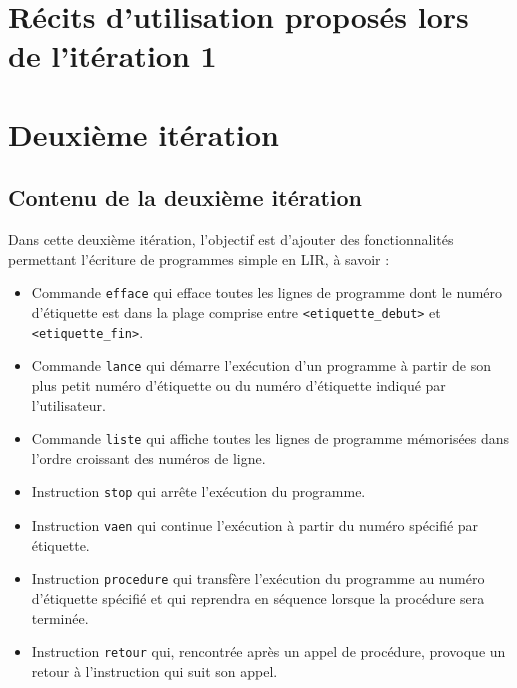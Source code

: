\documentclass[12pt,a4paper,titlepage,openany, oneside]{report}
\begin{document}
    \footnotesize
    \chapter*{Récits d'utilisation proposés lors de l'itération 1}
    
    \newpage
    
    
    
    
    
    
    
    
    
    

    \large
    \chapter{Deuxième itération}
    \section*{Contenu de la deuxième itération}
    Dans cette deuxième itération, l'objectif est d'ajouter des
    fonctionnalités permettant l'écriture de programmes simple
    en LIR, à savoir :
    \begin{itemize}
        \item Commande \verb|efface| qui efface toutes les lignes
              de programme dont le numéro d’étiquette est dans la
              plage comprise entre \verb|<etiquette_debut>| et
              \verb|<etiquette_fin>|.
        \item Commande \verb|lance| qui démarre l’exécution d’un
              programme à partir de son plus petit numéro d’étiquette
              ou du numéro d'étiquette indiqué par l'utilisateur.
        \item Commande \verb|liste| qui affiche toutes les lignes de
              programme mémorisées dans l'ordre croissant des numéros
              de ligne.
        \item Instruction \verb|stop| qui arrête l'exécution du programme.
        \item Instruction \verb|vaen| qui continue l'exécution à partir
              du numéro spécifié par étiquette.
        \item Instruction \verb|procedure| qui transfère l'exécution du
              programme au numéro d’étiquette spécifié et qui reprendra
              en séquence lorsque la procédure sera terminée.
        \item Instruction \verb|retour| qui, rencontrée après un appel
              de procédure, provoque un retour à l'instruction qui suit
              son appel.
    \end{itemize}
\end{document}

